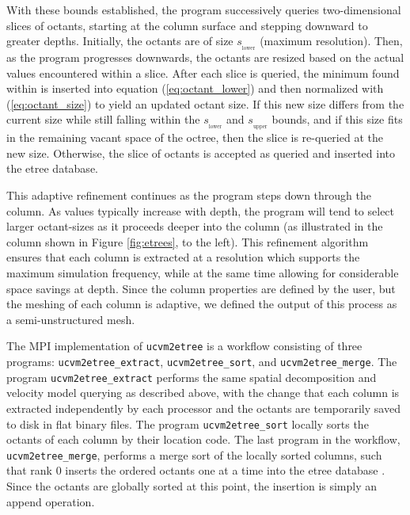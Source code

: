 With these bounds established, the program successively queries two-dimensional slices of octants, starting at the column surface and stepping downward to greater depths. Initially, the octants are of size $s_{_{\mathrm{lower}}}$ (maximum resolution). Then, as the program progresses downwards, the octants are resized based on the actual \vs{} values encountered within a slice. After each slice is queried, the minimum \vs{} found within is inserted into equation (\ref{eq:octant_lower}) and then normalized with (\ref{eq:octant_size}) to yield an updated octant size. If this new size differs from the current size while still falling within the $s_{_{\mathrm{lower}}}$ and $s_{_{\mathrm{upper}}}$ bounds, and if this size fits in the remaining vacant space of the octree, then the slice is re-queried at the new size. Otherwise, the slice of octants is accepted as queried and inserted into the etree database.

This adaptive refinement continues as the program steps down through the column. As \vs{} values typically increase with depth, the program will tend to select larger octant-sizes as it proceeds deeper into the column (as illustrated in the column shown in Figure \ref{fig:etrees}, to the left). This refinement algorithm ensures that each column is extracted at a resolution which supports the maximum simulation frequency, while at the same time allowing for considerable space savings at depth. Since the column properties are defined by the user, but the meshing of each column is adaptive, we defined the output of this process as a semi-unstructured mesh.

The MPI implementation of \texttt{ucvm2etree} is a workflow consisting of three programs: \texttt{ucvm2etree\_extract}, \texttt{ucvm2etree\_sort}, and \texttt{ucvm2etree\_merge}. The program \texttt{ucvm2etree\_extract} performs the same spatial decomposition and velocity model querying as described above, with the change that each column is extracted independently by each processor and the octants are temporarily saved to disk in flat binary files. The program \texttt{ucvm2etree\_sort} locally sorts the octants of each column by their location code. The last program in the workflow, \texttt{ucvm2etree\_merge}, performs a merge sort of the locally sorted columns, such that rank 0 inserts the ordered octants one at a time into the etree database \citep[in its natural $z$-order; see][]{Tu_2003_Tech}. Since the octants are globally sorted at this point, the insertion is simply an append operation. 

